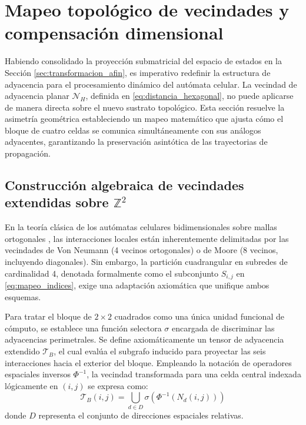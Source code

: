 \section{Mapeo topológico de vecindades y compensación dimensional}
\label{sec:mapeo_vecindades}

Habiendo consolidado la proyección submatricial del espacio de estados en la Sección \ref{sec:transformacion_afin}, es imperativo redefinir la estructura de adyacencia para el procesamiento dinámico del autómata celular. La vecindad de adyacencia planar $\mathcal{N}_H$, definida en \eqref{eq:distancia_hexagonal}, no puede aplicarse de manera directa sobre el nuevo sustrato topológico. Esta sección resuelve la asimetría geométrica estableciendo un mapeo matemático que ajusta cómo el bloque de cuatro celdas se comunica simultáneamente con sus análogos adyacentes, garantizando la preservación asintótica de las trayectorias de propagación.

\subsection{Construcción algebraica de vecindades extendidas sobre $\mathbb{Z}^2$}
\label{subsec:vecindades_extendidas}

En la teoría clásica de los autómatas celulares bidimensionales sobre mallas ortogonales \cite{Wolfram2002}, las interacciones locales están inherentemente delimitadas por las vecindades de Von Neumann (4 vecinos ortogonales) o de Moore (8 vecinos, incluyendo diagonales). Sin embargo, la partición cuadrangular en subredes de cardinalidad 4, denotada formalmente como el subconjunto $S_{i,j}$ en \eqref{eq:mapeo_indices}, exige una adaptación axiomática que unifique ambos esquemas.

Para tratar el bloque de $2 \times 2$ cuadrados como una única unidad funcional de cómputo, se establece una función selectora $\sigma$ encargada de discriminar las adyacencias perimetrales. Se define axiomáticamente un tensor de adyacencia extendido $\mathcal{T}_B$, el cual evalúa el subgrafo inducido para proyectar las seis interacciones hacia el exterior del bloque. Empleando la notación de operadores espaciales inversos $\Phi^{-1}$, la vecindad transformada para una celda central indexada lógicamente en $(i,j)$ se expresa como:
\begin{equation}
    \mathcal{T}_B(i,j) = \bigcup_{d \in D} \sigma \left( \Phi^{-1}(N_d(i,j)) \right)
    \label{eq:tensor_adyacencia}
\end{equation}
donde $D$ representa el conjunto de direcciones espaciales relativas.


